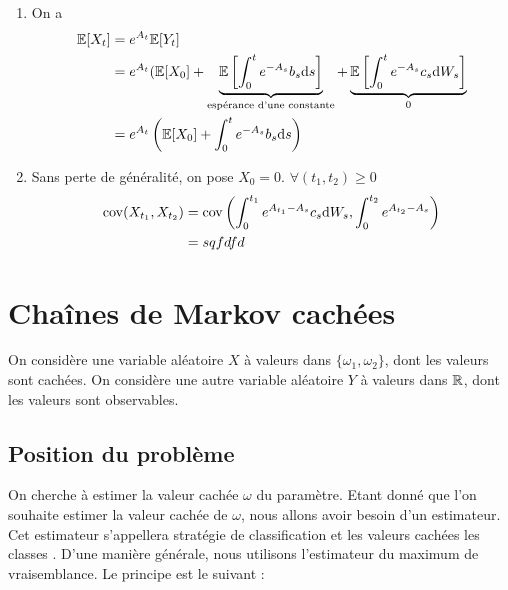 \begin{enumerate}
\item On a
  \begin{equation*}
  \begin{split}
    \mathbb{E}[X_t] &= e^{A_t}\mathbb{E}[Y_t] \\
    &= e^{A_t}( \mathbb{E}[X_0] + \underbrace{\mathbb{E}\left[ \int_{0}^{t} e^{-A_s} b_s \mathrm{d} s\right]}_{\text{espérance d'une constante}} + \underbrace{\mathbb{E}\left[ \int_{0}^{t} e^{-A_s} c_s \mathrm{d} W_s\right]}_{0} \\
    &= e^{A_t}\left(\mathbb{E}[X_0] + \int_{0}^{t} e^{-A_s} b_s \mathrm{d} s\right)
  \end{split}
  \end{equation*}
  
\item Sans perte de généralité, on pose $X_0 = 0$. $\forall (t_1, t_2) \geq 0$
  \newcommand{\tu}{t_1}
  \newcommand{\td}{t_2}
  \begin{equation*}
  \begin{split} 
    \cov(X_{\tu}, X_{\td}) &= \cov \left( \int_{0}^{\tu} e^{A_{\tu} -A_s}c_s \der \ws, \int_{0}^{\td} e^{A_{\td} - A_s} \right) \\
    &= sqfdfd
  \end{split}
  \end{equation*}

\end{enumerate}

\chapter{Chaînes de Markov cachées}

On considère une variable aléatoire $X$ à valeurs dans $\{\omega_1, \omega_2 \}$, dont les valeurs sont cachées. On considère une autre variable aléatoire $Y$ à valeurs dans $\mathbb{R}$, dont les valeurs sont observables. \\

\section{Position du problème}

On cherche à estimer la valeur cachée $\omega$ du paramètre. Etant donné que l'on souhaite estimer la valeur cachée de $\omega$, nous allons avoir besoin d'un estimateur.
Cet estimateur s'appellera \og stratégie de classification \fg{} et les valeurs cachées les \og classes \fg{}. D'une manière générale, nous utilisons l'estimateur du maximum de vraisemblance. Le principe est le suivant :

